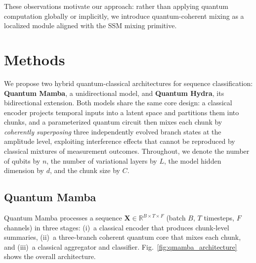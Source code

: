 \documentclass[conference]{IEEEtran}
\begin{document}
These observations motivate our approach: rather than applying quantum computation globally or implicitly, we introduce quantum-coherent mixing as a localized module aligned with the SSM mixing primitive.

\section{Methods}
\label{sec:methods}

We propose two hybrid quantum-classical architectures for sequence classification: \textbf{Quantum Mamba}, a unidirectional model, and \textbf{Quantum Hydra}, its bidirectional extension.
Both models share the same core design: a classical encoder projects temporal inputs into a latent space and partitions them into chunks, and a parameterized quantum circuit then mixes each chunk by \emph{coherently superposing} three independently evolved branch states at the amplitude level, exploiting interference effects that cannot be reproduced by classical mixtures of measurement outcomes.
Throughout, we denote the number of qubits by $n$, the number of variational layers by $L$, the model hidden dimension by $d$, and the chunk size by $C$.

\subsection{Quantum Mamba}
\label{sec:quantum_mamba}

Quantum Mamba processes a sequence $\mathbf{X} \in \mathbb{R}^{B \times T \times F}$ (batch $B$, $T$ timesteps, $F$ channels) in three stages: (i)~a classical encoder that produces chunk-level summaries, (ii)~a three-branch coherent quantum core that mixes each chunk, and (iii)~a classical aggregator and classifier.
Fig.~\ref{fig:qmamba_architecture} shows the overall architecture.


\end{document}
